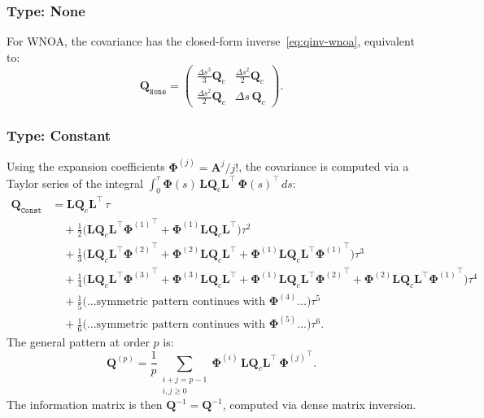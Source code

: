 \documentclass[11pt,a4paper]{article}
\newcommand{\inv}{^{-1}}
\newcommand{\bPhi}{\bm{\Phi}}
\newcommand{\bA}{\mathbf{A}}
\newcommand{\bQ}{\mathbf{Q}}
\newcommand{\bL}{\mathbf{L}}
\begin{document}
\subsubsection{Type: None}
For WNOA, the covariance has the closed-form inverse~\eqref{eq:qinv-wnoa}, equivalent to:
\begin{equation}
    \bQ_{\texttt{None}} = \begin{pmatrix} \frac{\Delta s^3}{3}\bQ_c & \frac{\Delta s^2}{2}\bQ_c \\ \frac{\Delta s^2}{2}\bQ_c & \Delta s\,\bQ_c \end{pmatrix}.
\end{equation}

\subsubsection{Type: Constant}
\label{sec:Q-constant}
Using the expansion coefficients $\bPhi^{(j)} = \bA^j/j!$, the covariance is computed via a Taylor series of the integral $\int_0^\tau \bPhi(s)\,\bL\bQ_c\bL^\top\,\bPhi(s)^\top\,ds$:
\begin{align}
    \bQ_{\texttt{Const}} &= \bL\bQ_c\bL^\top\,\tau \nonumber\\
    &\quad + \tfrac{1}{2}\bigl(\bL\bQ_c\bL^\top{\bPhi^{(1)}}^\top + \bPhi^{(1)}\bL\bQ_c\bL^\top\bigr)\tau^2 \nonumber\\
    &\quad + \tfrac{1}{3}\bigl(\bL\bQ_c\bL^\top{\bPhi^{(2)}}^\top + \bPhi^{(2)}\bL\bQ_c\bL^\top + \bPhi^{(1)}\bL\bQ_c\bL^\top{\bPhi^{(1)}}^\top\bigr)\tau^3 \nonumber\\
    &\quad + \tfrac{1}{4}\bigl(\bL\bQ_c\bL^\top{\bPhi^{(3)}}^\top + \bPhi^{(3)}\bL\bQ_c\bL^\top + \bPhi^{(1)}\bL\bQ_c\bL^\top{\bPhi^{(2)}}^\top + \bPhi^{(2)}\bL\bQ_c\bL^\top{\bPhi^{(1)}}^\top\bigr)\tau^4 \nonumber\\
    &\quad + \tfrac{1}{5}\bigl(\ldots\text{symmetric pattern continues with } \bPhi^{(4)}\ldots\bigr)\tau^5 \nonumber\\
    &\quad + \tfrac{1}{6}\bigl(\ldots\text{symmetric pattern continues with } \bPhi^{(5)}\ldots\bigr)\tau^6.
    \label{eq:Q-constant}
\end{align}
The general pattern at order $p$ is:
\begin{equation}
    \bQ^{(p)} = \frac{1}{p}\sum_{\substack{i+j = p-1 \\ i,j \geq 0}} \bPhi^{(i)}\,\bL\bQ_c\bL^\top\,{\bPhi^{(j)}}^\top.
\end{equation}
The information matrix is then $\bQ\inv = \bQ^{-1}$, computed via dense matrix inversion.
\end{document}
